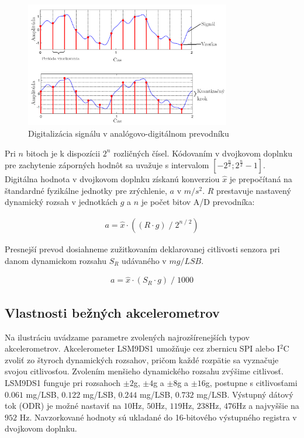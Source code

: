 \begin{figure}[h]
	\centering
	\includegraphics[width=0.8\textwidth]{figures/analysis/analog-to-digital-conversion.png}
	\caption{Digitalizácia signálu v analógovo-digitálnom prevodníku \cite{music-processing}}
\end{figure}
Pri $n$ bitoch je k dispozícii $2^n$ rozličných čísel. Kódovaním v dvojkovom doplnku pre zachytenie záporných hodnôt
sa uvažuje s intervalom $[-2^\frac{n}{2}; 2^\frac{n}{2} - 1]$. Digitálna hodnota v dvojkovom doplnku získanú konverziou
$\hat{x}$ je prepočítaná na štandardné fyzikálne jednotky pre zrýchlenie, $a$ v $m/s^2$. $R$ prestavuje nastavený
dynamický rozsah v jednotkách $g$ a $n$ je počet bitov A/D prevodníka:
\begin{ceqn}\begin{align}
   a = \hat{x} \cdot ((R \cdot g)\;/\;2^{n\;/\;2})
\end{align}\end{ceqn}

Presnejší prevod dosiahneme zužitkovaním deklarovanej citlivosti senzora pri danom dynamickom rozsahu $S_R$ udávaného v $mg/LSB$.
\begin{ceqn}\begin{align}
   a = \hat{x} \cdot (S_R \cdot g)\;/\;1000
\end{align}\end{ceqn}

\subsection{Vlastnosti bežných akcelerometrov} \label{section:accelometers}
Na ilustráciu uvádzame parametre zvolených najrozšírenejších typov akcelerometrov. Akcelerometer LSM9DS1 \cite{lsm9ds1} umožňuje cez
zbernicu SPI alebo I$^\mathrm{2}$C zvoliť zo štyroch dynamických rozsahov, pričom každé rozpätie sa vyznačuje svojou
citlivosťou. Zvolením menšieho dynamického rozsahu zvýšime citlivosť. LSM9DS1 funguje pri rozsahoch $\pm2$g, $\pm4$g a $\pm8$g
a $\pm16$g, postupne s citlivosťami
$0.061$ mg/LSB, $0.122$ mg/LSB, $0.244$ mg/LSB, $0.732$ mg/LSB. Výstupný dátový tok (ODR) je možné nastaviť na $10$Hz, $50$Hz,
$119$Hz, $238$Hz, $476$Hz a najvyššie na $952$ Hz. Navzorkované hodnoty sú ukladané do 16-bitového výstupného registra v
dvojkovom doplnku.

